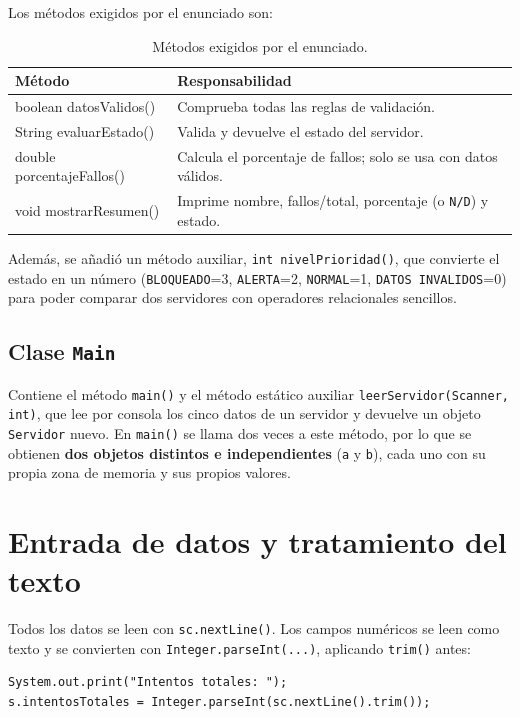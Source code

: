\documentclass[11pt,a4paper]{article}
\begin{document}
Los métodos exigidos por el enunciado son:

\begin{table}[h!]
\centering
\begin{tabular}{@{}>{\ttfamily}l p{9.5cm}@{}}
\toprule
\textbf{Método} & \textbf{Responsabilidad} \\
\midrule
boolean datosValidos()  & Comprueba todas las reglas de validación. \\
String evaluarEstado()  & Valida y devuelve el estado del servidor. \\
double porcentajeFallos() & Calcula el porcentaje de fallos; solo se usa con datos válidos. \\
void mostrarResumen()   & Imprime nombre, fallos/total, porcentaje (o \texttt{N/D}) y estado. \\
\bottomrule
\end{tabular}
\caption{Métodos exigidos por el enunciado.}
\end{table}

Además, se añadió un método auxiliar, \texttt{int nivelPrioridad()}, que
convierte el estado en un número (\texttt{BLOQUEADO}=3, \texttt{ALERTA}=2,
\texttt{NORMAL}=1, \texttt{DATOS INVALIDOS}=0) para poder comparar dos
servidores con operadores relacionales sencillos.

\subsection{Clase \texttt{Main}}
Contiene el método \texttt{main()} y el método estático auxiliar
\texttt{leerServidor(Scanner, int)}, que lee por consola los cinco datos de un
servidor y devuelve un objeto \texttt{Servidor} nuevo. En \texttt{main()} se
llama dos veces a este método, por lo que se obtienen \textbf{dos objetos
distintos e independientes} (\texttt{a} y \texttt{b}), cada uno con su propia
zona de memoria y sus propios valores.


\section{Entrada de datos y tratamiento del texto}
Todos los datos se leen con \texttt{sc.nextLine()}. Los campos numéricos se
leen como texto y se convierten con \texttt{Integer.parseInt(...)}, aplicando
\texttt{trim()} antes:

\begin{lstlisting}
System.out.print("Intentos totales: ");
s.intentosTotales = Integer.parseInt(sc.nextLine().trim());
\end{lstlisting}
\end{document}
